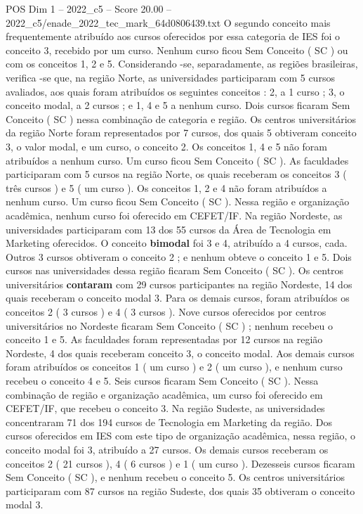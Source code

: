 \begin{textsample}{POS Dim 1 – 2022\_c5 – Score 20.00 – 2022\_c5/enade\_2022\_tec\_mark\_64d0806439.txt}
O segundo conceito mais frequentemente atribuído aos cursos oferecidos por essa categoria de IES foi o conceito 3, recebido por um curso.
Nenhum curso ficou Sem Conceito ( SC ) ou com os conceitos 1, 2 e 5.
Considerando -se, separadamente, as regiões brasileiras, verifica -se que, na região Norte, as universidades participaram com 5 cursos avaliados, aos quais foram atribuídos os seguintes conceitos : 2, a 1 curso ; 3, o conceito modal, a 2 cursos ; e 1, 4 e 5 a nenhum curso.
Dois cursos ficaram Sem Conceito ( SC ) nessa combinação de categoria e região.
Os centros universitários da região Norte foram representados por 7 cursos, dos quais 5 obtiveram conceito 3, o valor modal, e um curso, o conceito 2.
Os conceitos 1, 4 e 5 não foram atribuídos a nenhum curso.
Um curso ficou Sem Conceito ( SC ).
As faculdades participaram com 5 cursos na região Norte, os quais receberam os conceitos 3 ( três cursos ) e 5 ( um curso ).
Os conceitos 1, 2 e 4 não foram atribuídos a nenhum curso.
Um curso ficou Sem Conceito ( SC ).
Nessa região e organização acadêmica, nenhum curso foi oferecido em CEFET/IF.
Na região Nordeste, as universidades participaram com 13 dos 55 cursos da Área de Tecnologia em Marketing oferecidos.
O conceito \textbf{bimodal} foi 3 e 4, atribuído a 4 cursos, cada.
Outros 3 cursos obtiveram o conceito 2 ; e nenhum obteve o conceito 1 e 5.
Dois cursos nas universidades dessa região ficaram Sem Conceito ( SC ).
Os centros universitários \textbf{contaram} com 29 cursos participantes na região Nordeste, 14 dos quais receberam o conceito modal 3.
Para os demais cursos, foram atribuídos os conceitos 2 ( 3 cursos ) e 4 ( 3 cursos ).
Nove cursos oferecidos por centros universitários no Nordeste ficaram Sem Conceito ( SC ) ; nenhum recebeu o conceito 1 e 5.
As faculdades foram representadas por 12 cursos na região Nordeste, 4 dos quais receberam conceito 3, o conceito modal.
Aos demais cursos foram atribuídos os conceitos 1 ( um curso ) e 2 ( um curso ), e nenhum curso recebeu o conceito 4 e 5.
Seis cursos ficaram Sem Conceito ( SC ).
Nessa combinação de região e organização acadêmica, um curso foi oferecido em CEFET/IF, que recebeu o conceito 3.
Na região Sudeste, as universidades concentraram 71 dos 194 cursos de Tecnologia em Marketing da região.
Dos cursos oferecidos em IES com este tipo de organização acadêmica, nessa região, o conceito modal foi 3, atribuído a 27 cursos.
Os demais cursos receberam os conceitos 2 ( 21 cursos ), 4 ( 6 cursos ) e 1 ( um curso ).
Dezesseis cursos ficaram Sem Conceito ( SC ), e nenhum recebeu o conceito 5.
Os centros universitários participaram com 87 cursos na região Sudeste, dos quais 35 obtiveram o conceito modal 3.

\end{textsample}
